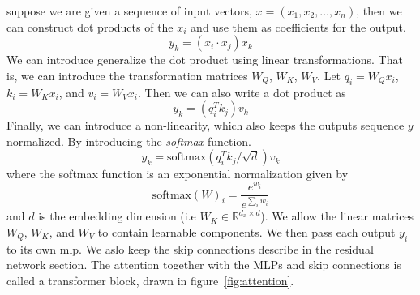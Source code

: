 suppose we are given a sequence of input vectors, $x=(x_1,x_2,\ldots,x_n)$, then we can construct dot products of the $x_i$ and use them as coefficients for the output.
\begin{equation}
	y_k = (x_i \cdot x_j)x_k
\end{equation}
We can introduce generalize the dot product using linear transformations. That is, we can introduce the transformation matrices $W_Q$, $W_K$, $W_V$. Let $q_i = W_Q x_i$, $k_i = W_K x_i$, and $v_i = W_V x_i$. Then we can also write a dot product as 
\begin{equation}
	y_k = (q_i^T k_j)v_k
\end{equation}
Finally, we can introduce a non-linearity, which also keeps the outputs sequence $y$ normalized. By introducing the \textit{softmax} function.
\begin{equation}
	y_k = \mathrm{softmax}(q_i^T k_j / \sqrt{d})v_k
\end{equation}
where the softmax function is an exponential normalization given by
\begin{equation}
	\mathrm{softmax}(W)_i = \frac{e^{w_i}}{e^{\sum_i{w_i}}}
\end{equation}
and $d$ is the embedding dimension (i.e $W_K\in \mathbb{R}^{d_x\times d}$).
We allow the linear matrices $W_Q$, $W_K$, and $W_V$ to contain learnable components. We then pass each output $y_i$ to its own mlp. We aslo keep the skip connections describe in the residual network section. The attention together with the MLPs and skip connections is called a transformer block, drawn in figure~\ref{fig:attention}.
